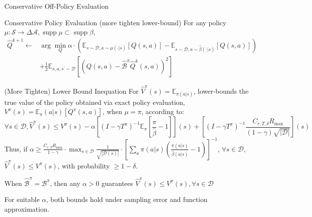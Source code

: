 \documentclass[11pt]{beamer}
\newcommand{\mbb}[1]{\mathbb{#1}}
\newcommand{\mc}[1]{\mathcal{#1}}
\newcommand{\abs}[1]{\left\lvert #1 \right\rvert}
\newcommand{\supp}{\operatorname{supp}}
\begin{document}
\begin{frame}{Conservative Off-Policy Evaluation}
  \begin{block}{Conservative Policy Evaluation (more tighten lower-bound)}
    For any policy $\mu : \mc{S} \to \Delta{\mc{A}}, \supp \mu \subset \supp \beta$,
    \[
    \begin{aligned}
      \hat{Q}^{k+1} \leftarrow &\arg \min_{Q} \alpha \cdot \left(\mbb{E}_{s \sim \mc{D}, a \sim \mu(\cdot|s)}[Q(s,a)] - \mbb{E}_{s \sim \mc{D}, a \sim \hat{\beta}(\cdot|s)} \left[Q(s,a)\right] \right) \\
      &+ \frac{1}{2} \mbb{E}_{s,a,s^\prime \sim \mc{D}} \left[ \left(Q(s,a) - \hat{\mc{B}}^\pi \hat{Q}^{k}(s,a)\right)^2\right]
  \end{aligned}
  \]
  \end{block}

  \begin{block}{(More Tighten) Lower Bound Inequation}
    For $\hat{V}^{\pi}(s) = \mbb{E}_{\pi(a|s)}$, lower-bounds the true value of the policy obtained via exact policy evaluation, $V^\pi(s) = \mbb{E}_{\pi}(a|s) [Q^\pi(s,a)]$, when $\mu=\pi$, according to:
    \[
      \forall s \in \mc{D}, \hat{V}^\pi (s) \leq V^\pi (s) - \alpha \left[(I - \gamma T^\pi)^{-1} \mbb{E}_\pi  \left[\frac{\pi}{\hat{\beta}} - 1\right]\right] (s) + \left[(I - \gamma T^\pi)^{-1} \frac{C_{r, T, \delta}R_{\text{max}}}{(1-\gamma)\sqrt{\abs{\mc{D}}}}\right](s)
    \]
    Thus, if $\alpha \geq \frac{C_{r,T}R_{\text{max}}}{1-\gamma} \cdot \max_{s\in \mc{D}}\frac{1}{\sqrt{\abs{\mc{D}(s)}}}\cdot \left[\sum_a \pi(a|s) (\frac{\pi(a|s)}{\hat{\beta}(a|s)}-1)\right]^{-1}$, $\forall s \in \mc{D}$, $\hat{V}^{\pi}(s) \leq V^\pi (s)$, with probability $\geq 1 - \delta$.

    When $\hat{\mc{B}}^\pi = \mc{B}^\pi$, then any $\alpha >0$ guarantees $\hat{V}^\pi (s) \leq V^{\pi} (s), \forall s \in \mc{D}$
  \end{block}
  For suitable $\alpha$, both bounds hold under sampling error and function approximation.
\end{frame}
\end{document}
